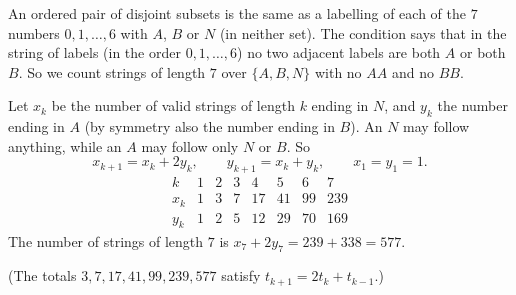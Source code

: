 An ordered pair of disjoint subsets is the same as a labelling of each of the $7$ numbers $0,1,\dots,6$ with $A$, $B$ or $N$ (in neither set). The condition says that in the string of labels (in the order $0,1,\dots,6$) no two adjacent labels are both $A$ or both $B$. So we count strings of length $7$ over $\{A,B,N\}$ with no $AA$ and no $BB$.

Let $x_k$ be the number of valid strings of length $k$ ending in $N$, and $y_k$ the number ending in $A$ (by symmetry also the number ending in $B$). An $N$ may follow anything, while an $A$ may follow only $N$ or $B$. So
\[x_{k+1}=x_k+2y_k,\qquad y_{k+1}=x_k+y_k,\qquad x_1=y_1=1 .\]
\[\begin{array}{c|ccccccc}
k&1&2&3&4&5&6&7\\\hline
x_k&1&3&7&17&41&99&239\\
y_k&1&2&5&12&29&70&169
\end{array}\]
The number of strings of length $7$ is $x_7+2y_7=239+338=\boxed{577}$.

(The totals $3,7,17,41,99,239,577$ satisfy $t_{k+1}=2t_k+t_{k-1}$.)
